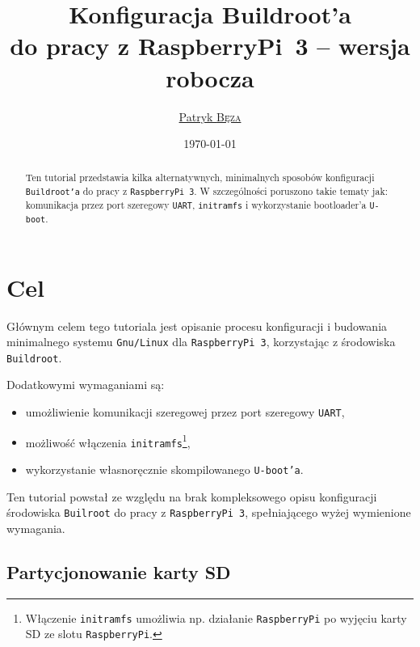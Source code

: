 \documentclass{article}
\title{Konfiguracja Buildroot'a\\do pracy z RaspberryPi~3 -- wersja robocza}
\author{\href{mailto:bezap@student.mini.pw.edu.pl}{Patryk \textsc{Bęza}}}
\date{\today}
\begin{document}
\maketitle

\begin{abstract}
\noindent Ten tutorial przedstawia kilka alternatywnych, minimalnych sposobów konfiguracji \texttt{Buildroot'a} do pracy z \texttt{RaspberryPi~3}. W szczególności poruszono takie tematy jak: komunikacja przez port szeregowy \texttt{UART}, \texttt{initramfs} i wykorzystanie bootloader'a \texttt{U-boot}.
\end{abstract}


\section{Cel}

Głównym celem tego tutoriala jest opisanie procesu konfiguracji i budowania minimalnego systemu \texttt{Gnu/Linux} dla \texttt{RaspberryPi~3}, korzystając z środowiska \texttt{Buildroot}.

Dodatkowymi wymaganiami są:
\begin{itemize}
	\item umożliwienie komunikacji szeregowej przez port szeregowy \texttt{UART},
	\item możliwość włączenia \texttt{initramfs}\footnote{Włączenie \texttt{initramfs} umożliwia np. działanie \texttt{RaspberryPi} po wyjęciu karty SD ze slotu \texttt{RaspberryPi}.},
	\item wykorzystanie własnoręcznie skompilowanego \texttt{U-boot'a}.
\end{itemize}
Ten tutorial powstał ze względu na brak kompleksowego opisu konfiguracji środowiska \texttt{Builroot} do pracy z \texttt{RaspberryPi~3}, spełniającego wyżej wymienione wymagania.


\subsection{Partycjonowanie karty SD}
\label{sec:partitions}
\end{document}
